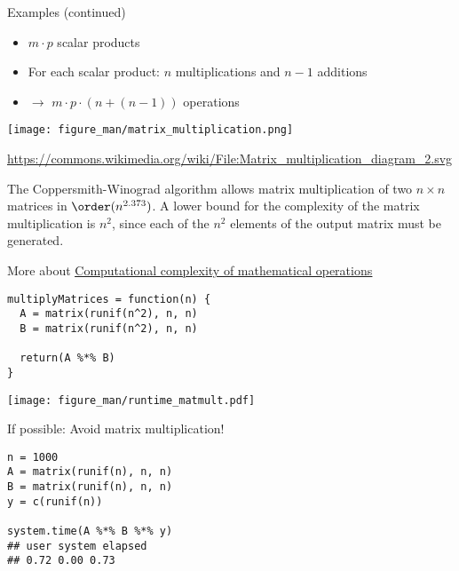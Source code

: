 \documentclass[11pt,compress,t,notes=noshow, xcolor=table]{beamer}
\begin{document}
\begin{vbframe}{Examples (continued)}
\begin{itemize}
\item $m \cdot p$ scalar products
\item For each scalar product: $n$ multiplications and $n - 1$ additions
\item $\rightarrow$ $m \cdot p \cdot (n + (n - 1))$ operations
\end{itemize}

\begin{center}
\texttt{[image: figure\_man/matrix\_multiplication.png]}\\
\begin{footnotesize}
\url{https://commons.wikimedia.org/wiki/File:Matrix\_multiplication\_diagram\_2.svg}
\end{footnotesize}
\end{center}


\framebreak
The Coppersmith-Winograd algorithm allows matrix multiplication of two $n\times n$ matrices in $\order(n^{2.373})$. A lower bound for the complexity of the matrix multiplication is $n^2$, since each of the $n^2$ elements of the output matrix must be generated.

\vfill
\begin{footnotesize}
More about \href{https://en.wikipedia.org/wiki/Computational_complexity_of_mathematical_operations}{\color{blue}\underline{Computational complexity of mathematical operations}}
\end{footnotesize}

\framebreak

\begin{verbatim}
multiplyMatrices = function(n) {
  A = matrix(runif(n^2), n, n)
  B = matrix(runif(n^2), n, n)

  return(A %*% B)
}
\end{verbatim}

\vspace{-0.2cm}
\begin{center}
\texttt{[image: figure\_man/runtime\_matmult.pdf]}
\end{center}

\framebreak

If possible: Avoid matrix multiplication!
\begin{verbatim}
n = 1000
A = matrix(runif(n), n, n)
B = matrix(runif(n), n, n)
y = c(runif(n))

system.time(A %*% B %*% y)
## user system elapsed 
## 0.72 0.00 0.73


\end{verbatim}
\end{vbframe}
\end{document}
